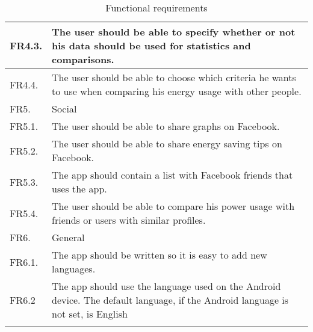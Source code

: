 \begin{longtable}{|l|p{14.5cm}|}
FR4.3. &The user should be able to specify whether or not his data should be used for statistics and comparisons.\\\hline
FR4.4.& The user should be able to choose which criteria he wants to use when comparing his energy usage with other people.\\\hline
\cellcolor{lightgray}FR5.& \cellcolor{lightgray}Social\\\hline
FR5.1. &The user should be able to share graphs on Facebook.\\\hline
FR5.2. &The user should be able to share energy saving tips on Facebook.\\\hline
FR5.3.& The app should contain a list with Facebook friends that uses the app.\\\hline
FR5.4.& The user should be able to compare his power usage with friends or users with similar profiles.\\\hline
\cellcolor{lightgray}FR6.& \cellcolor{lightgray}General\\\hline
FR6.1. & The app should be written so it is easy to add new languages.\\\hline FR6.2 & The app should use the language used on the Android device. The default language, if the Android language is not set, is English\\\hline
\caption{Functional requirements}
\label{tab:funcReq}
\end{longtable} 

